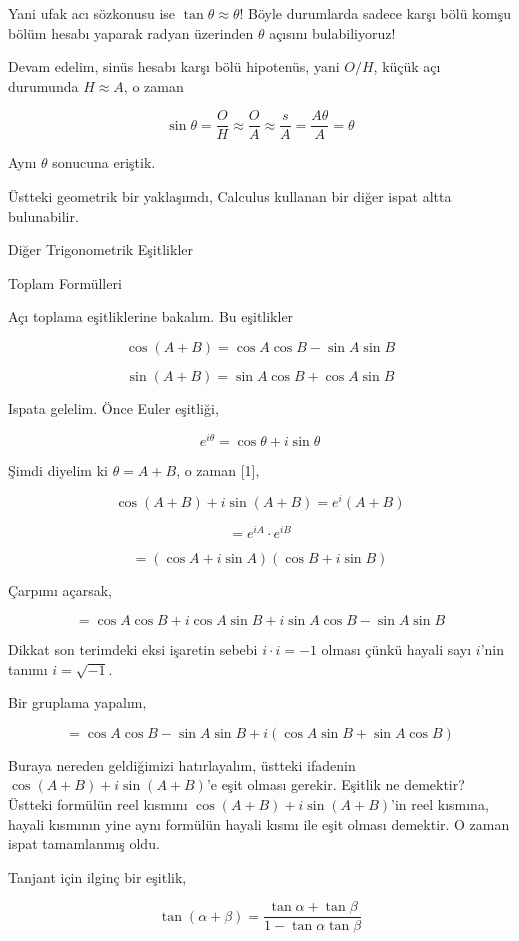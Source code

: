\documentclass[12pt,fleqn]{article}\usepackage{../../common}
\begin{document}
Yani ufak acı sözkonusu ise $\tan \theta \approx \theta$! Böyle durumlarda
sadece karşı bölü komşu bölüm hesabı yaparak radyan üzerinden $\theta$
açısını bulabiliyoruz!

Devam edelim, sinüs hesabı karşı bölü hipotenüs, yani $O / H$, küçük açı
durumunda $H \approx A$, o zaman

$$
\sin \theta = \frac{O}{H} \approx \frac{O}{A} \approx \frac{s}{A} = \frac{A\theta}{A} = \theta
$$

Aynı $\theta$ sonucuna eriştik. 

Üstteki geometrik bir yaklaşımdı, Calculus kullanan bir diğer ispat altta
bulunabilir.

Diğer Trigonometrik Eşitlikler

Toplam Formülleri

Açı toplama eşitliklerine bakalım. Bu eşitlikler

$$
\cos(A+B) = \cos A \cos B - \sin A \sin B
$$

$$
\sin(A+B) = \sin A \cos B + \cos A \sin B
$$

Ispata gelelim. Önce Euler eşitliği,

$$
e^{i\theta} = \cos\theta + i\sin\theta
$$

Şimdi diyelim ki $\theta = A+B$, o zaman [1],

$$
\cos(A+B) + i\sin(A+B) = e^i(A+B)
$$

$$
= e^{iA} \cdot e^{iB}
$$

$$
= (\cos A + i\sin A) (\cos B + i\sin B)
$$

Çarpımı açarsak,

$$
= \cos A \cos B + i\cos A \sin B +
i\sin A \cos B - \sin A \sin B
$$

Dikkat son terimdeki eksi işaretin sebebi $i \cdot i = -1$ olması çünkü hayali
sayı $i$'nin tanımı $i = \sqrt{-1}$. 

Bir gruplama yapalım, 

$$
= \cos A \cos B - \sin A \sin B + i (\cos A \sin B + \sin A \cos B )
$$

Buraya nereden geldiğimizi hatırlayalım, üstteki ifadenin $\cos(A+B) + i\sin(A+B)$'e
eşit olması gerekir. Eşitlik ne demektir? Üstteki formülün reel kısmını
$\cos(A+B) + i\sin(A+B)$'in reel kısmına, hayali kısmının yine aynı formülün
hayali kısmı ile eşit olması demektir. O zaman ispat tamamlanmış oldu.

Tanjant için ilginç bir eşitlik,

$$
\tan (\alpha + \beta) = \frac{\tan\alpha + \tan\beta}{1 - \tan\alpha \tan\beta}
$$
\end{document}
